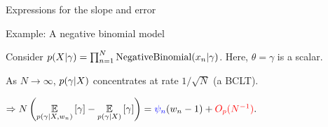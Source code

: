 \begin{frame}[t]{Expressions for the slope and error}


\end{frame}




\begin{frame}[t]{Example: A negative binomial model}

    
    Consider $p(X \vert \gamma) = \prod_{n=1}^N \textrm{NegativeBinomial}(x_n \vert \gamma)$. Here, $\theta = \gamma$ is a scalar.  
    
    As $N \rightarrow \infty$, $p(\gamma \vert X)$ concentrates at rate $1 / \sqrt{N}$ (a BCLT).
    
    $\Rightarrow 
    N \left( \underset{p(\gamma \vert X, w_n)}{\mathbb{E}}\left[\gamma\right] -
    \underset{p(\gamma \vert X)}{\mathbb{E}}\left[\gamma\right] \right) = \textcolor{blue}{\psi_n} (w_n - 1) + \textcolor{red}{O_p(N^{-1})}.
    $
    
    
    \vspace{1.5em}
    \LowDimAccuracyGraph{}
    

\end{frame}